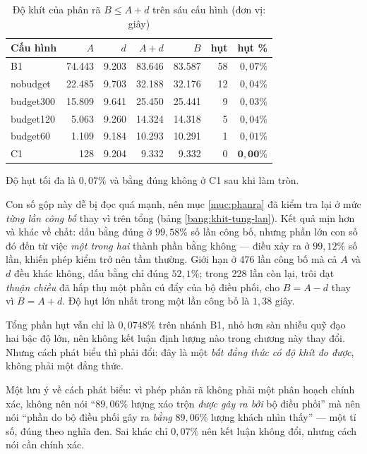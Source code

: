 \begin{table}[htbp]
\centering
\caption{Độ khít của phân rã $B \le A + d$ trên sáu cấu hình (đơn vị: giây)}
\label{bang:cong-khit}
\small
\begin{tabular}{@{}lrrrrrr@{}}
\toprule
\textbf{Cấu hình} & $A$ & $d$ & $A+d$ & $B$ & \textbf{hụt} & \textbf{hụt \%}\\
\midrule
B1 & 74.443 & 9.203 & 83.646 & 83.587 & 58 & $0{,}07\%$\\
nobudget & 22.485 & 9.703 & 32.188 & 32.176 & 12 & $0{,}04\%$\\
budget300 & 15.809 & 9.641 & 25.450 & 25.441 & 9 & $0{,}03\%$\\
budget120 & 5.063 & 9.260 & 14.324 & 14.318 & 5 & $0{,}04\%$\\
budget60 & 1.109 & 9.184 & 10.293 & 10.291 & 1 & $0{,}01\%$\\
C1 & 128 & 9.204 & 9.332 & 9.332 & 0 & $\mathbf{0{,}00\%}$\\
\bottomrule
\end{tabular}
\end{table}

Độ hụt tối đa là $0{,}07\%$ và bằng đúng không ở C1 sau khi làm tròn.

Con số gộp này dễ bị đọc quá mạnh, nên mục \ref{muc:phanra} đã kiểm tra lại ở mức \emph{từng lần
công bố} thay vì trên tổng (bảng \ref{bang:khit-tung-lan}). Kết quả mịn hơn và khác về chất: dấu
bằng đúng ở $99{,}58\%$ số lần công bố, nhưng phần lớn con số đó đến từ việc \emph{một trong hai}
thành phần bằng không --- điều xảy ra ở $99{,}12\%$ số lần, khiến phép kiểm trở nên tầm thường.
Giới hạn ở 476 lần công bố mà cả $A$ và $d$ đều khác không, dấu bằng chỉ đúng $52{,}1\%$; trong
228 lần còn lại, trôi dạt \emph{thuận chiều} đã hấp thụ một phần cú đẩy của bộ điều phối, cho
$B = A - d$ thay vì $B = A + d$. Độ hụt lớn nhất trong một lần công bố là $1{,}38$ giây.

Tổng phần hụt vẫn chỉ là $0{,}0748\%$ trên nhánh B1, nhỏ hơn sàn nhiễu quỹ đạo hai bậc độ lớn,
nên không kết luận định lượng nào trong chương này thay đổi. Nhưng cách phát biểu thì phải đổi:
đây là một \emph{bất đẳng thức có độ khít đo được}, không phải một đẳng thức.

Một lưu ý về cách phát biểu: vì phép phân rã không phải một phân hoạch chính xác, không nên nói
``$89{,}06\%$ lượng xáo trộn \emph{được gây ra bởi} bộ điều phối'' mà nên nói ``phần do bộ điều
phối gây ra \emph{bằng} $89{,}06\%$ lượng khách nhìn thấy'' --- một tỉ số, đúng theo nghĩa đen.
Sai khác chỉ $0{,}07\%$ nên kết luận không đổi, nhưng cách nói cần chính xác.


